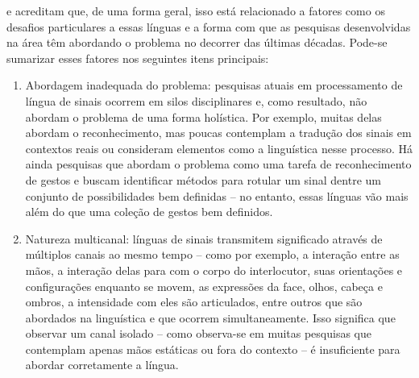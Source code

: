 

 e  acreditam que, de uma forma geral, isso está relacionado a fatores como os desafios particulares a essas línguas e a forma com que as pesquisas desenvolvidas na área têm abordando o problema no decorrer das últimas décadas.
Pode-se sumarizar esses fatores nos seguintes itens principais:

\begin{enumerate}
    \item Abordagem inadequada do problema: pesquisas atuais em processamento de língua de sinais ocorrem em silos disciplinares e, como resultado, não abordam o problema de uma forma holística. Por exemplo, muitas delas abordam o reconhecimento, mas poucas contemplam a tradução dos sinais em contextos reais ou consideram elementos como a linguística nesse processo.
    Há ainda pesquisas que abordam o problema como uma tarefa de reconhecimento de gestos e buscam identificar métodos para rotular um sinal dentre um conjunto de possibilidades bem definidas -- no entanto, essas línguas vão mais além do que uma coleção de gestos bem definidos.

    \item Natureza multicanal: línguas de sinais transmitem significado através de múltiplos canais ao mesmo tempo -- como por exemplo, a interação entre as mãos, a interação delas para com o corpo do interlocutor, suas orientações e configurações enquanto se movem, as expressões da face, olhos, cabeça e ombros, a intensidade com eles são articulados, entre outros que são abordados na linguística e que ocorrem simultaneamente.
    Isso significa que observar um canal isolado -- como observa-se em muitas pesquisas que contemplam apenas mãos estáticas ou fora do contexto -- é insuficiente para abordar corretamente a língua.
    

\end{enumerate}
